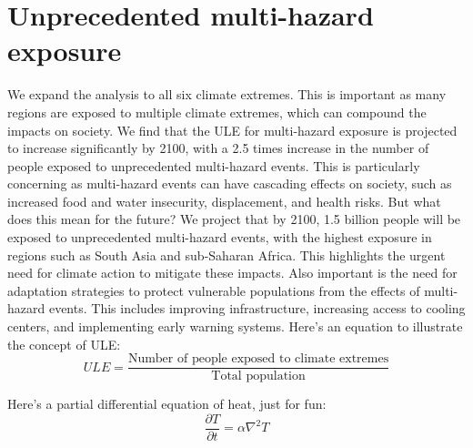 \documentclass[9pt, twoside, twocolumn]{extarticle}
\begin{document}
\section*{Unprecedented multi-hazard exposure}
We expand the analysis to all six climate extremes. This is important as many regions are exposed to multiple climate extremes, which can compound the impacts on society. We find that the ULE for multi-hazard exposure is projected to increase significantly by 2100, with a 2.5 times increase in the number of people exposed to unprecedented multi-hazard events.\cite{Grant2025} This is particularly concerning as multi-hazard events can have cascading effects on society, such as increased food and water insecurity, displacement, and health risks.\cite{IPCC2021} But what does this mean for the future? We project that by 2100, 1.5 billion people will be exposed to unprecedented multi-hazard events, with the highest exposure in regions such as South Asia and sub-Saharan Africa.\cite{Grant2025} This highlights the urgent need for climate action to mitigate these impacts. Also important is the need for adaptation strategies to protect vulnerable populations from the effects of multi-hazard events. This includes improving infrastructure, increasing access to cooling centers, and implementing early warning systems.\cite{IPCC2021}
Here's an equation to illustrate the concept of ULE:
\begin{equation}
    ULE = \frac{\text{Number of people exposed to climate extremes}}{\text{Total population}}
\end{equation}

Here's a partial differential equation of heat, just for fun:
\begin{equation}
    \frac{\partial T}{\partial t} = \alpha \nabla^2 T
\end{equation}
\end{document}
